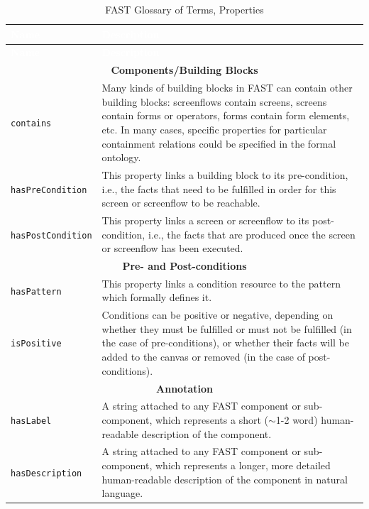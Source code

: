 \documentclass{article}
\begin{document}
\singlespacing
\begin{small}
\begin{longtable}{|p{3.25cm}|p{11cm}|}
\caption{\label{tab:glossary_of_terms_properties}FAST Glossary of Terms, Properties}\\
\hline
\rowcolor{fast@lightgrey}\textcolor{white}{\textbf{Name}} & 
	\textcolor{white}{\textbf{Description}} \\ \hline
\endfirsthead
\rowcolor{fast@lightgrey}\textcolor{white}{\textbf{Name}} & 
	\textcolor{white}{\textbf{Description}} \\ \hline
\endhead
\multicolumn{2}{|c|}{\textbf{Components/Building Blocks}} \\ \hline
\texttt{contains} & Many kinds of building blocks in FAST can contain other building blocks: screenflows contain screens, screens contain forms or operators, forms contain form elements, etc. In many cases, specific properties for particular containment relations could be specified in the formal ontology.  \\ \hline
\texttt{hasPreCondition} & This property links a building block to its pre-condition, i.e., the facts that need to be fulfilled in order for this screen or screenflow to be reachable. \\ \hline
\texttt{hasPostCondition} & This property links a screen or screenflow to its post-condition, i.e., the facts that are produced once the screen or screenflow has been executed. \\ \hline
\multicolumn{2}{|c|}{\textbf{Pre- and Post-conditions}} \\ \hline
\texttt{hasPattern} & This property links a condition resource to the pattern which formally defines it. \\ \hline
\texttt{isPositive} & Conditions can be positive or negative, depending on whether they must be fulfilled or must not be fulfilled (in the case of pre-conditions), or whether their facts will be added to the canvas or removed (in the case of post-conditions). \\ \hline
\multicolumn{2}{|c|}{\textbf{Annotation}} \\ \hline
\texttt{hasLabel} & A string attached to any FAST component or sub-component, which represents a short ($\sim$1-2 word) human-readable description of the component. \\ \hline
\texttt{hasDescription} & A string attached to any FAST component or sub-component, which represents a longer, more detailed human-readable description of the component in natural language. \\ \hline

\end{longtable}
\end{small}
\end{document}
